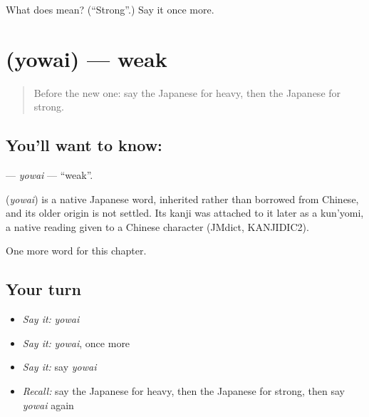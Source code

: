 \begin{tcolorbox}[breakable,colback=teal!4,colframe=teal!35!black,title={Before you move on}]
What does  mean? (\textquotedblleft{}Strong\textquotedblright{}.) Say it once more.
\end{tcolorbox}
\section[\texorpdfstring{\ja{よわい} (yowai)}{よわい (yowai)}]{ (yowai) — weak}

\label{lesson:JA-C51-yowai}



\begin{quote}
Before the new one: say the Japanese for heavy, then the Japanese for strong.
\end{quote}

\subsection*{You'll want to know: }
\textbf{} — \emph{yowai} — \textquotedblleft{}weak\textquotedblright{}.

\begin{cousinweb}
\textbf{} (\emph{yowai}) is a native Japanese word, inherited rather than borrowed from Chinese, and its older origin is not settled. Its kanji was attached to it later as a kun'yomi, a native reading given to a Chinese character (JMdict, KANJIDIC2).
\end{cousinweb}

\begin{grammarlens}[title={What you've built}]
One more word for this chapter.
\end{grammarlens}

\subsection*{Your turn}
\begin{itemize}
\raggedright
  \item \emph{Say it:} \emph{yowai}
  \item \emph{Say it:} \emph{yowai}, once more
  \item \emph{Say it:} say \emph{yowai}
  \item \emph{Recall:} say the Japanese for heavy, then the Japanese for strong, then say \emph{yowai} again
\end{itemize}

